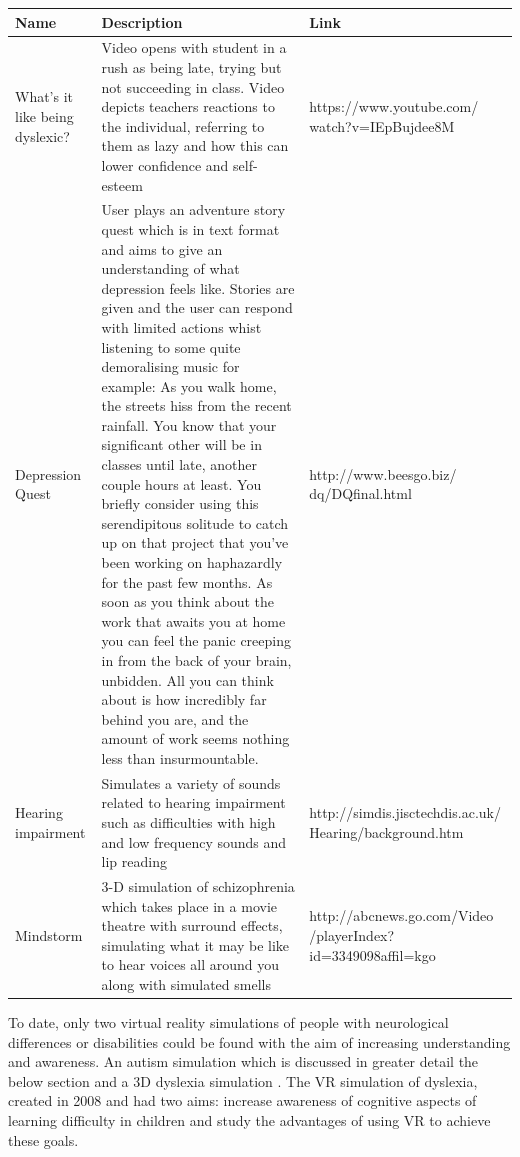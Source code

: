 \documentclass[11pt]{report}
\begin{document}
\begin{table}
    \begin{tabular}{| p{2cm} | p{9cm} | p{5cm} |}
    \hline
    Name & Description & Link                                                                                                                                                                                   \\
    \hline
    \hline
  	What's it like being dyslexic? &  Video opens with student in a rush as being late, trying but not succeeding in class. Video depicts teachers reactions to the individual, referring to them as lazy and how this can lower confidence and self-esteem & https://www.youtube.com/ watch?v=IEpBujdee8M \\ \hline
  	Depression Quest  & User plays an adventure story quest which is in text format and aims to give an understanding of what depression feels like. Stories are given and the user can respond with limited actions whist listening to some quite demoralising music for example: As you walk home, the streets hiss from the recent rainfall. You know that your significant other will be in classes until late, another couple hours at least. You briefly consider using this serendipitous solitude to catch up on that project that you've been working on haphazardly for the past few months. As soon as you think about the work that awaits you at home you can feel the panic creeping in from the back of your brain, unbidden. All you can think about is how incredibly far behind you are, and the amount of work seems nothing less than insurmountable. & http://www.beesgo.biz/ dq/DQfinal.html \\ \hline
  	Hearing impairment & Simulates a variety of sounds related to hearing impairment such as difficulties with high and low frequency sounds and lip reading & http://simdis.jisctechdis.ac.uk/ Hearing/background.htm\\ \hline
Mindstorm & 3-D simulation of schizophrenia which takes place in a movie theatre with surround effects, simulating what it may be like to hear voices all around you along with simulated smells & http://abcnews.go.com/Video /playerIndex?id=3349098affil=kgo \\ \hline
    \end{tabular}
\end{table}

To date, only two virtual reality simulations of people with neurological differences or disabilities could be found with the aim of increasing understanding and awareness. An autism simulation which is discussed in greater detail the below section and a 3D dyslexia simulation \cite{dyslexicsimpar}. The VR simulation of dyslexia, created in 2008 and had two aims: increase awareness of cognitive aspects of learning difficulty in children and study the advantages of using VR to achieve these goals. 
\end{document}
